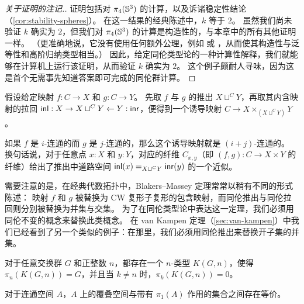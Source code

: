 \begin{proof}[关于证明的注记.]
证明包括对 $\pi_4(\Sn ^3)$ 的计算，以及诉诸稳定性结论（\cref{cor:stability-spheres}）。
在这一结果的经典陈述中，$k$ 等于 $2$。
虽然我们尚未验证 $k$ 确实为 $2$，但我们对 $\pi_4(\Sn ^3)$ 的计算是构造性的，与本章中的所有其他证明一样。
（更准确地说，它没有使用任何额外公理，例如 \LEM{} 或 \choice{}，从而使其构造性与泛等性和高阶归纳类型相当。）
因此，给定同伦类型论的一种计算性解释，我们就能够在计算机上运行该证明，从而验证 $k$ 确实为 $2$。
这个例子颇耐人寻味，因为这是首个无需事先知道答案即可完成的同伦群计算。
\end{proof}

%

\begin{thm}\label{Blakers-Massey}
  假设给定映射 $f : C  \rightarrow X$ 和 $g : C \rightarrow Y$。
  先取 $f$ 与 $g$ 的推出 $X \sqcup^C Y $，再取其内含映射的拉回 $\inl : X \rightarrow X \sqcup^C Y \leftarrow Y : \inr$，便得到一个诱导映射 $C \to X \times_{(X \sqcup^C Y)} Y$。

  如果 $f$ 是 $i$-连通的而 $g$ 是 $j$-连通的，那么这个诱导映射就是 $(i+j)$-连通的。
  换句话说，对于任意点 $x:X$ 和 $y:Y$，对应的纤维 $C_{x,y}$（即 $(f,g) : C \to X \times Y $ 的纤维）给出了推出中道路空间 $\id[X \sqcup^C Y]{\inl(x)}{\inr(y)}$ 的一个近似。
\end{thm}

需要注意的是，在经典代数拓扑中，Blakers--Massey 定理常常以稍有不同的形式陈述：
映射 $f$ 和 $g$ 被替换为 CW 复形子复形的包含映射，而同伦推出与同伦拉回则分别被替换为并集与交集。
为了在同伦类型论中表达这一定理，我们必须用同伦不变的概念来替换此类概念。
在 van Kampen 定理（\cref{sec:van-kampen}）中我们已经看到了另一个类似的例子：在那里，我们必须用同伦推出来替换开子集的并集。

\begin{thm}\label{Eilenberg-Mac-Lane-Spaces}
对于任意交换群 $G$ 和正整数 $n$，都存在一个 $n$-类型
$K(G,n)$，使得 $\pi_n(K(G,n)) = G$，并且当 $k\neq n$ 时，$\pi_k(K(G,n)) = 0$。
\end{thm}

\begin{thm}[覆叠空间]\label{thm:covering-spaces}
  对于连通空间 $A$，$A$ 上的覆叠空间与带有 $\pi_1(A)$ 作用的集合之间存在等价。
\end{thm}

